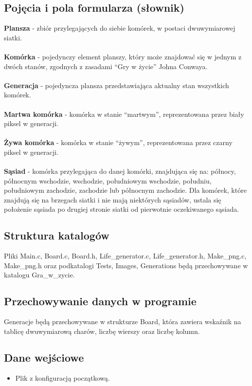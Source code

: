 \documentclass[12pt,a4paper,notitlepage]{report}
\begin{document}
\subsection{Pojęcia i pola formularza (słownik)}
\textbf{Plansza} - zbiór przylegających do siebie komórek, w postaci dwuwymiarowej siatki.\\
\\
\textbf {Komórka} - pojedynczy element planszy, który może znajdować się w jednym z dwóch stanów, zgodnych z zasadami “Gry w życie” Johna Conwaya.\\
\\
\textbf {Generacja} - pojedyncza plansza przedstawiająca aktualny stan wszystkich komórek.\\
\\
\textbf {Martwa komórka} - komórka w stanie “martwym”, reprezentowana przez biały piksel w generacji.\\
\\
\textbf {Żywa komórka} - komórka w stanie “żywym”, reprezentowana przez czarny piksel w generacji.\\
\\
\textbf {Sąsiad} - komórka przylegająca do danej komórki, znajdująca się na: północy, północnym wschodzie, wschodzie, południowym wschodzie, południu, południowym zachodzie, zachodzie lub północnym zachodzie. Dla komórek, które znajdują się na brzegach siatki i nie mają niektórych sąsiadów, ustala się położenie sąsiada po drugiej stronie siatki od pierwotnie oczekiwanego sąsiada.
\subsection{Struktura katalogów}
Pliki Main.c, Board.c, Board.h, Life\_generator.c, Life\_generator.h, Make\_png.c, Make\_png.h oraz podkatalogi Tests, Images, Generations będą przechowywane w katalogu Gra\_w\_zycie.
\subsection{Przechowywanie danych w programie}
Generacje będą przechowywane w strukturze Board, która zawiera wskaźnik na tablicę dwuwymiarową charów, liczbę wierszy oraz liczbę kolumn.
\subsection{Dane wejściowe}
\begin{itemize}
	\item Plik z konfiguracją początkową.
\end{itemize}
\end{document}
